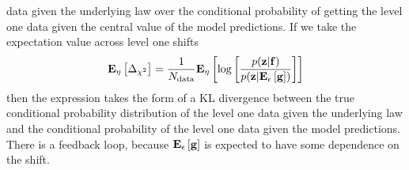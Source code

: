 data given the underlying law over the conditional probability of getting the
level one data given the central value of the model predictions. If we take the
expectation value across level one shifts
\begin{equation}\label{eq:deltachi2kldef}
    \begin{split}
        \mathbf{E}_{\eta}\left[ \Delta_{\chi^2} \right] = \frac{1}{N_{\rm data}} \mathbf{E}_{\eta}\left[ 
            \log \left[ \frac{p(\mathbf{z}| \mathbf{f})}{
                p(\mathbf{z}| \mathbf{E}_{\epsilon}\left[ \mathbf{g} \right])} \right] \right]
    \end{split}
\end{equation}
then the expression takes the form of a KL divergence between the true conditional
probability distribution of the level one data given the underlying law and the
conditional probability of the level one data given the model predictions. There
is a feedback loop, because $\mathbf{E}_{\epsilon}\left[ \mathbf{g} \right]$ is expected to have some
dependence on the shift.

